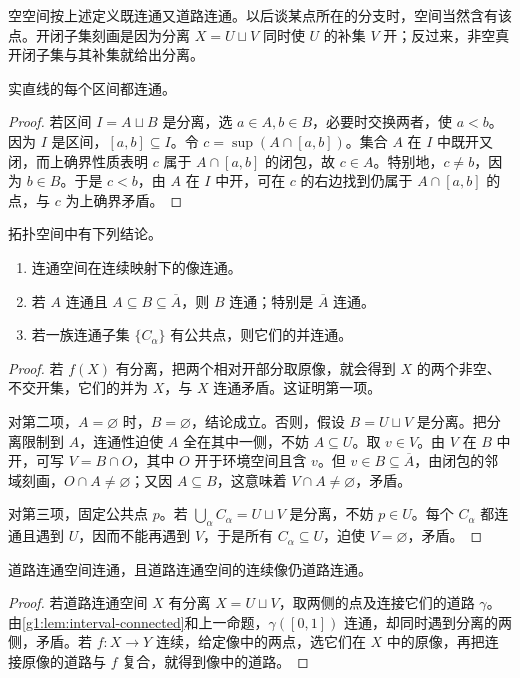 空空间按上述定义既连通又道路连通。以后谈某点所在的分支时，空间当然含有该点。开闭子集刻画是因为分离 \(X=U\sqcup V\) 同时使 \(U\) 的补集 \(V\) 开；反过来，非空真开闭子集与其补集就给出分离。

\begin{lemma}\label{g1:lem:interval-connected}
	实直线的每个区间都连通。
\end{lemma}
\begin{proof}
	若区间 \(I=A\sqcup B\) 是分离，选 \(a\in A,b\in B\)，必要时交换两者，使 \(a<b\)。因为 \(I\) 是区间，\([a,b]\subseteq I\)。令 \(c=\sup(A\cap[a,b])\)。集合 \(A\) 在 \(I\) 中既开又闭，而上确界性质表明 \(c\) 属于 \(A\cap[a,b]\) 的闭包，故 \(c\in A\)。特别地，\(c\ne b\)，因为 \(b\in B\)。于是 \(c<b\)，由 \(A\) 在 \(I\) 中开，可在 \(c\) 的右边找到仍属于 \(A\cap[a,b]\) 的点，与 \(c\) 为上确界矛盾。
\end{proof}

\begin{proposition}\label{g1:prop:connected-image-closure}
	拓扑空间中有下列结论。
	\begin{enumerate}
		\item 连通空间在连续映射下的像连通。
		\item 若 \(A\) 连通且 \(A\subseteq B\subseteq\overline A\)，则 \(B\) 连通；特别是 \(\overline A\) 连通。
		\item 若一族连通子集 \(\{C_\alpha\}\) 有公共点，则它们的并连通。
	\end{enumerate}
\end{proposition}
\begin{proof}
	若 \(f(X)\) 有分离，把两个相对开部分取原像，就会得到 \(X\) 的两个非空、不交开集，它们的并为 \(X\)，与 \(X\) 连通矛盾。这证明第一项。

	对第二项，\(A=\varnothing\) 时，\(B=\varnothing\)，结论成立。否则，假设 \(B=U\sqcup V\) 是分离。把分离限制到 \(A\)，连通性迫使 \(A\) 全在其中一侧，不妨 \(A\subseteq U\)。取 \(v\in V\)。由 \(V\) 在 \(B\) 中开，可写 \(V=B\cap O\)，其中 \(O\) 开于环境空间且含 \(v\)。但 \(v\in B\subseteq\overline A\)，由闭包的邻域刻画，\(O\cap A\ne\varnothing\)；又因 \(A\subseteq B\)，这意味着 \(V\cap A\ne\varnothing\)，矛盾。

	对第三项，固定公共点 \(p\)。若 \(\bigcup_\alpha C_\alpha=U\sqcup V\) 是分离，不妨 \(p\in U\)。每个 \(C_\alpha\) 都连通且遇到 \(U\)，因而不能再遇到 \(V\)，于是所有 \(C_\alpha\subseteq U\)，迫使 \(V=\varnothing\)，矛盾。
\end{proof}

\begin{corollary}\label{g1:cor:path-connected-connected}
	道路连通空间连通，且道路连通空间的连续像仍道路连通。
\end{corollary}
\begin{proof}
	若道路连通空间 \(X\) 有分离 \(X=U\sqcup V\)，取两侧的点及连接它们的道路 \(\gamma\)。由\cref{g1:lem:interval-connected}和上一命题，\(\gamma([0,1])\) 连通，却同时遇到分离的两侧，矛盾。若 \(f:X\to Y\) 连续，给定像中的两点，选它们在 \(X\) 中的原像，再把连接原像的道路与 \(f\) 复合，就得到像中的道路。
\end{proof}

